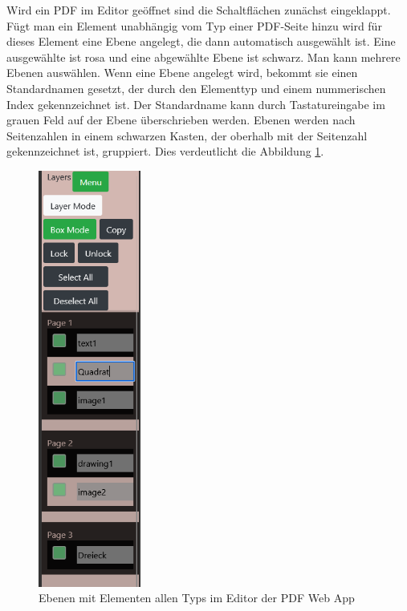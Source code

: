 Wird ein PDF im Editor geöffnet sind die Schaltflächen zunächst eingeklappt. Fügt man ein Element unabhängig vom Typ einer PDF-Seite hinzu wird für dieses Element eine Ebene angelegt, die dann automatisch ausgewählt ist. Eine ausgewählte ist rosa und eine abgewählte Ebene ist schwarz. Man kann mehrere Ebenen auswählen. Wenn eine Ebene angelegt wird, bekommt sie einen Standardnamen gesetzt, der durch den Elementtyp und einem nummerischen Index gekennzeichnet ist. Der Standardname kann durch Tastatureingabe im grauen Feld auf der Ebene überschrieben werden. Ebenen werden nach Seitenzahlen in einem schwarzen Kasten, der oberhalb mit der Seitenzahl gekennzeichnet ist, gruppiert. Dies verdeutlicht die Abbildung \ref{fig:ebenen}.   

\begin{figure}[!htbp]
	\centering
	\includegraphics[width=0.3\textwidth]{"images/ebenen.png"}
	\caption{Ebenen mit Elementen allen Typs im Editor der PDF Web App}
	\label{fig:ebenen}
\end{figure}

